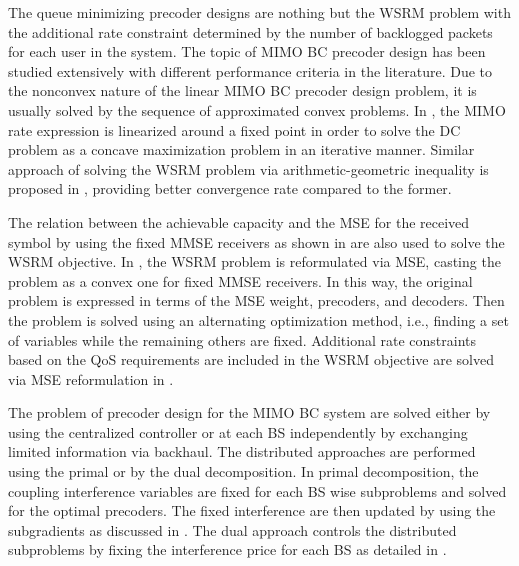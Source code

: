 The queue minimizing precoder designs are nothing but the \ac{WSRM} problem with the additional rate constraint determined by the number of backlogged packets for each user in the system. The topic of \ac{MIMO} \ac{BC} precoder design has been studied extensively with different performance criteria in the literature. Due to the nonconvex nature of the linear \ac{MIMO} \ac{BC} precoder design problem, it is usually solved by the sequence of approximated convex problems. In \cite{sin_algorithm}, the \ac{MIMO} rate expression is linearized around a fixed point in order to solve the \ac{DC} problem as a concave maximization problem in an iterative manner. Similar approach of solving the \ac{WSRM} problem via arithmetic-geometric inequality is proposed in \cite{tran2012fast}, providing better convergence rate compared to the former.

The relation between the achievable capacity and the \ac{MSE} for the received symbol by using the fixed \ac{MMSE} receivers as shown in \cite{viswanath1999optimal,mse_duality} are also used to solve the \ac{WSRM} objective. In \cite{christensen2008weighted,wmmse_shi}, the \ac{WSRM} problem is reformulated via \ac{MSE}, casting the problem as a convex one for fixed \ac{MMSE} receivers. In this way, the original problem is expressed in terms of the \ac{MSE} weight, precoders, and decoders. Then the problem is solved using an alternating optimization method, i.e., finding a set of variables while the remaining others are fixed. Additional rate constraints based on the \ac{QoS} requirements are included in the \ac{WSRM} objective are solved via \ac{MSE} reformulation in \cite{kaleva2013primal}.

The problem of precoder design for the \ac{MIMO} \ac{BC} system are solved either by using the centralized controller or at each \ac{BS} independently by exchanging limited information via backhaul. The distributed approaches are performed using the primal or by the dual decomposition. In primal decomposition, the coupling interference variables are fixed for each \ac{BS} wise subproblems and solved for the optimal precoders. The fixed interference are then updated by using the subgradients as discussed in \cite{pennanen2011decentralized}. The dual approach controls the distributed subproblems by fixing the interference price for each \ac{BS} as detailed in \cite{tolli2011decentralized}.

